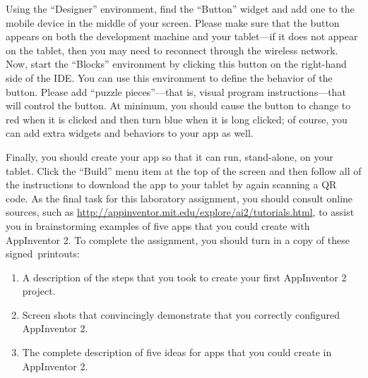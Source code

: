 Using the ``Designer'' environment, find the ``Button'' widget and add one to the mobile device in the middle of your
screen.  Please make sure that the button appears on both the development machine and your tablet---if it does not
appear on the tablet, then you may need to reconnect through the wireless network. Now, start the ``Blocks'' environment
by clicking this button on the right-hand side of the IDE. You can use this environment to define the behavior
of the button.  Please add ``puzzle pieces''---that is, visual program instructions---that will control the button. At
minimum, you should cause the button to change to red when it is clicked and then turn blue when it is long clicked; of
course, you can add extra widgets and behaviors to your app as well.

Finally, you should create your app so that it can run, stand-alone, on your tablet. Click the ``Build'' menu item at the
top of the screen and then follow all of the instructions to download the app to your tablet by again scanning a QR
code.  As the final task for this laboratory assignment, you should consult online sources, such as
\url{http://appinventor.mit.edu/explore/ai2/tutorials.html}, to assist you in brainstorming examples of five apps that
you could create with AppInventor 2. To complete the assignment, you should turn in a copy of these \mbox{signed
  printouts}: 



\vspace*{-.1in}

\begin{enumerate}
	\itemsep0em
	\item A description of the steps that you took  to create your first AppInventor 2 project.
	\item Screen shots that convincingly demonstrate that you correctly configured AppInventor 2.
	\item The complete description of five ideas for apps that you could create in AppInventor 2.
\end{enumerate}

